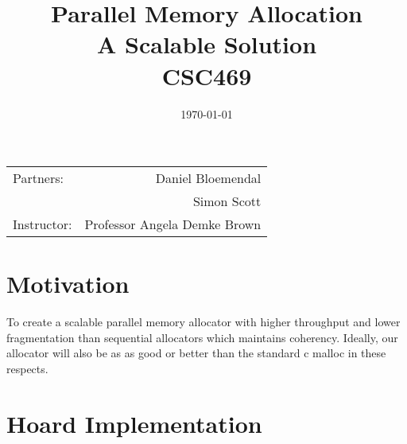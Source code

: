 \documentclass{article}
\title{Parallel Memory Allocation \\ A Scalable Solution \\ CSC469} %
\date{\today} %
\begin{document}
\maketitle %

\begin{center}
\begin{tabular}{l r}
Partners: & Daniel Bloemendal \\ %
& Simon Scott \\
Instructor: & Professor Angela Demke Brown %
\end{tabular}
\end{center}



\section{Motivation}

\indent \indent To create a scalable parallel memory allocator with higher throughput and lower fragmentation than sequential allocators which maintains coherency.  Ideally, our allocator will also be as as good or better than the standard c malloc in these respects.


\section{Hoard Implementation}
\end{document}
